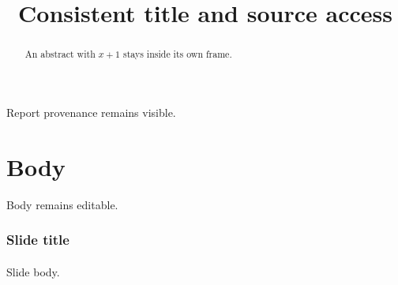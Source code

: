 \documentclass{article}
\title{Consistent title and source access}
\author{}
\date{}
\begin{document}
\date{}
\begin{abstract}
An abstract with $x+1$ stays inside its own frame.
\end{abstract}
Report provenance remains visible.
\maketitle
\setcounter{section}{0}
\setlength{\itemsep}{6pt}
\setcounter{page}{1}
\section{Body}
\emph{}
Body remains editable.
\begin{frame}
\frametitle{Slide title}
\framesubtitle{}
Slide body.
\end{frame}
\end{document}
